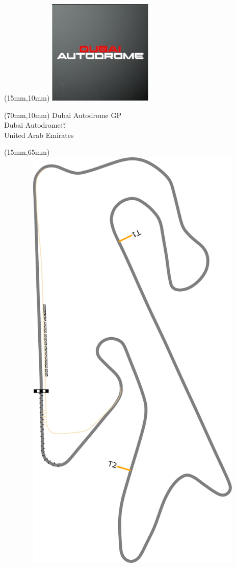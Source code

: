 \null\newpage
\begin{textblock*}{50mm}(15mm,10mm)%
\includegraphics[width=50mm]{LG/2015-05-20_00081.png}
\end{textblock*}
\begin{textblock*}{130mm}(70mm,10mm)%
{\fontsize{20}{20}\selectfont Dubai Autodrome GP\\}
{\fontsize{16}{16}\selectfont Dubai Autodrome\hfill \huge$\circlearrowleft$\\}
{\fontsize{12}{12}\selectfont United Arab Emirates\\}
\end{textblock*}
\begin{textblock*}{185mm}(15mm,65mm)%
\centering
\mbox{\includegraphics[width=185mm,height=210mm,keepaspectratio]{PT/DUAUGP.pdf}}
\end{textblock*}
